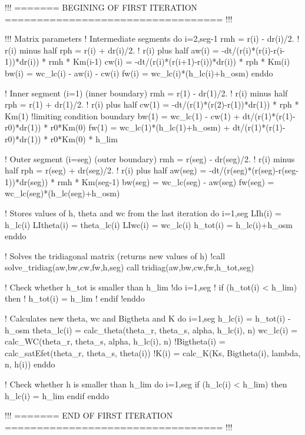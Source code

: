     !!! ======= BEGINING OF FIRST ITERATION ================================== !!!
    
    !!! Matrix parameters
    ! Intermediate segments
    do i=2,seg-1
      rmh = r(i) - dr(i)/2.	! r(i) minus half
      rph = r(i) + dr(i)/2.	! r(i) plus half
      aw(i) = -dt/(r(i)*(r(i)-r(i-1))*dr(i)) * rmh * Km(i-1)
      cw(i) = -dt/(r(i)*(r(i+1)-r(i))*dr(i)) * rph * Km(i)
      bw(i) = wc_lc(i) - aw(i) - cw(i)
      fw(i) = wc_lc(i)*(h_lc(i)+h_osm)
    enddo
    
    ! Inner segment (i=1) (inner boundary)
    rmh = r(1) - dr(1)/2.	! r(i) minus half
    rph = r(1) + dr(1)/2.	! r(i) plus half
    cw(1) = -dt/(r(1)*(r(2)-r(1))*dr(1)) * rph * Km(1)
    !limiting condition boundary
    bw(1) = wc_lc(1) - cw(1) + dt/(r(1)*(r(1)-r0)*dr(1)) * r0*Km(0)
    fw(1) = wc_lc(1)*(h_lc(1)+h_osm) + dt/(r(1)*(r(1)-r0)*dr(1)) * r0*Km(0) * h_lim
    
    ! Outer segment (i=seg) (outer boundary)
    rmh = r(seg) - dr(seg)/2.	! r(i) minus half
    rph = r(seg) + dr(seg)/2.	! r(i) plus half
    aw(seg) = -dt/(r(seg)*(r(seg)-r(seg-1))*dr(seg)) * rmh * Km(seg-1)
    bw(seg) = wc_lc(seg) - aw(seg)
    fw(seg) = wc_lc(seg)*(h_lc(seg)+h_osm)
    
    ! Stores values of h, theta and wc from the last iteration
    do i=1,seg
      LIh(i) = h_lc(i)
      LItheta(i) = theta_lc(i)
      LIwc(i) = wc_lc(i)
      h_tot(i) = h_lc(i)+h_osm
    enddo
    
    ! Solves the tridiagonal matrix (returns new values of h)
    !call solve_tridiag(aw,bw,cw,fw,h,seg)
    call tridiag(aw,bw,cw,fw,h_tot,seg)
      
    ! Check whether h_tot is smaller than h_lim
    !do i=1,seg
    !  if (h_tot(i) < h_lim) then
    !    h_tot(i) = h_lim
    !  endif
    !enddo

    ! Calculates new theta, wc and Bigtheta and K
    do i=1,seg
      h_lc(i) = h_tot(i) - h_osm
      theta_lc(i) = calc_theta(theta_r, theta_s, alpha, h_lc(i), n)
      wc_lc(i) = calc_WC(theta_r, theta_s, alpha, h_lc(i), n)
      !Bigtheta(i) = calc_satEfet(theta_r, theta_s, theta(i))
      !K(i) = calc_K(Ks, Bigtheta(i), lambda, n, h(i))
    enddo

    ! Check whether h is smaller than h_lim
    do i=1,seg
      if (h_lc(i) < h_lim) then
        h_lc(i) = h_lim
      endif
    enddo

    
    !!! ======= END OF FIRST ITERATION ================================== !!!
    
